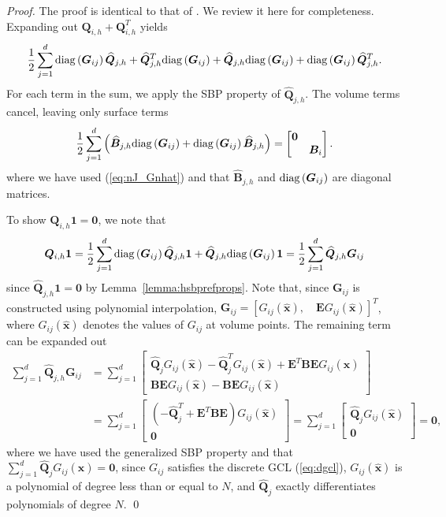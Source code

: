 \documentclass{svjour3}                     %
\renewcommand{\hat}{\widehat}
\newcommand{\diag}[1]{{\rm diag}\LRp{#1}}
\newcommand{\LRp}[1]{\left( #1 \right)}
\newcommand{\LRs}[1]{\left[ #1 \right]}
\begin{document}
\begin{proof}
The proof is identical to that of \cite{chan2018discretely}.  
We review it here for completeness.  Expanding out $\bm{Q}_{i,h} + \bm{Q}_{i,h}^T$ yields
\[
\frac{1}{2}\sum_{j=1}^d \diag{\bm{G}_{ij}}\hat{\bm{Q}}_{j,h} + \hat{\bm{Q}}_{j,h}^T\diag{\bm{G}_{ij}} + \hat{\bm{Q}}_{j,h} \diag{\bm{G}_{ij}} +  \diag{\bm{G}_{ij}}\hat{\bm{Q}}_{j,h}^T.
\]
For each term in the sum, we apply the SBP property of $\hat{\bm{Q}}_{j,h}$.  The volume terms cancel, leaving only surface terms
\[
\frac{1}{2}\sum_{j=1}^d \LRp{\hat{\bm{B}}_{j,h}\diag{\bm{G}_{ij}} +  \diag{\bm{G}_{ij}}\hat{\bm{B}}_{j,h}} = \begin{bmatrix}
\bm{0} &\\
& \bm{B}_i \end{bmatrix}.
\]
where we have used (\ref{eq:nJ_Gnhat}) and that $\hat{\bm{B}}_{j,h}$ and $\diag{\bm{G}_{ij}}$ are diagonal matrices.  

To show $\bm{Q}_{i,h}\bm{1} = \bm{0}$, we note that
\[
\bm{Q}_{i,h}\bm{1} = \frac{1}{2}\sum_{j=1}^d \diag{\bm{G}_{ij}}\hat{\bm{Q}}_{j,h}\bm{1} + \hat{\bm{Q}}_{j,h} \diag{\bm{G}_{ij}}\bm{1} = \frac{1}{2}\sum_{j=1}^d \hat{\bm{Q}}_{j,h} \bm{G}_{ij}
\]
since $\hat{\bm{Q}}_{j,h}\bm{1} = \bm{0}$ by Lemma~\ref{lemma:hsbprefprops}.  Note that, since $\bm{G}_{ij}$ is constructed using polynomial interpolation, $\bm{G}_{ij} = \LRs{G_{ij}(\hat{\bm{x}}), \quad \bm{E}G_{ij}(\hat{\bm{x}})}^T$, where $G_{ij}(\hat{\bm{x}})$ denotes the values of $G_{ij}$ at volume points.  The remaining term can be expanded out
\begin{align*}
\sum_{j=1}^d \hat{\bm{Q}}_{j,h} \bm{G}_{ij} &= \sum_{j=1}^d \begin{bmatrix} \hat{\bm{Q}}_jG_{ij}(\hat{\bm{x}}) - \hat{\bm{Q}}_j^TG_{ij}(\hat{\bm{x}}) + \bm{E}^T\bm{B}\bm{E}G_{ij}(\hat{\bm{x}})\\
\bm{B}\bm{E}G_{ij}(\hat{\bm{x}}) - \bm{B}\bm{E}G_{ij}(\hat{\bm{x}})
\end{bmatrix} \\
&=
\sum_{j=1}^d \begin{bmatrix} \LRp{- \hat{\bm{Q}}_j^T + \bm{E}^T\bm{B}\bm{E}}G_{ij}(\hat{\bm{x}})\\
\bm{0}
\end{bmatrix} = 
\sum_{j=1}^d \begin{bmatrix} \hat{\bm{Q}}_jG_{ij}(\hat{\bm{x}})\\
\bm{0}
\end{bmatrix}  = \bm{0},
\end{align*}
where we have used  the generalized SBP property and that $\sum_{j=1}^d\hat{\bm{Q}}_jG_{ij}(\hat{\bm{x}}) = \bm{0}$, since $G_{ij}$ satisfies the discrete GCL (\ref{eq:dgcl}), $G_{ij}(\hat{\bm{x}})$ is a polynomial of degree less than or equal to $N$, and $\hat{\bm{Q}}_j$ exactly differentiates polynomials of degree $N$.  
\qed\end{proof}
\end{document}
